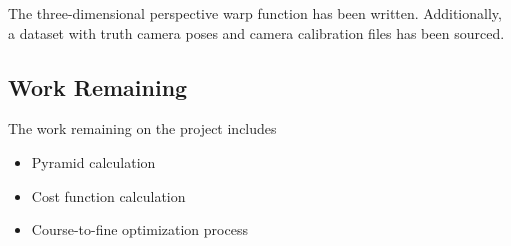 \documentclass[conference]{IEEEtran}
\begin{document}
The three-dimensional perspective warp function has been written.
Additionally, a dataset with truth camera poses and camera calibration files has been sourced.

\subsection{Work Remaining}

The work remaining on the project includes

\begin{itemize}
    \item Pyramid calculation
    \item Cost function calculation
    \item Course-to-fine optimization process
\end{itemize}





\end{document}
